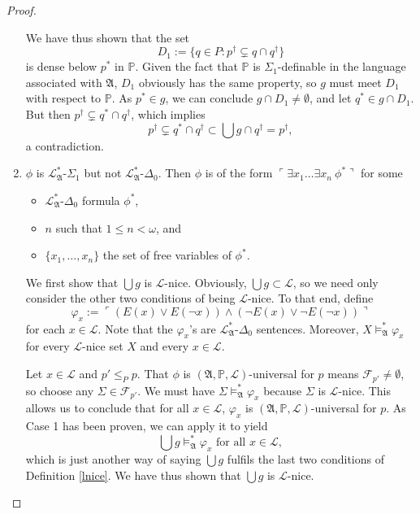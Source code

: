 \documentclass[12pt]{article}
\numberwithin{equation}{section}
\begin{document}
\begin{proof}
\begin{enumerate}[label=Case \arabic*:, leftmargin=50pt]
    We have thus shown that the set $$D_1 := \{q \in P : p^{\dagger} \subsetneq q \cap q^{\dagger}\}$$ is dense below $p^*$ in $\mathbb{P}$. Given the fact that $\mathbb{P}$ is $\Sigma_1$-definable in the language associated with $\mathfrak{A}$, $D_1$ obviously has the same property, so $g$ must meet $D_1$ with respect to $\mathbb{P}$. As $p^* \in g$, we can conclude $g \cap D_1 \neq \emptyset$, and let $q^* \in g \cap D_1$. But then $p^{\dagger} \subsetneq q^* \cap q^{\dagger}$, which implies $$p^{\dagger} \subsetneq q^* \cap q^{\dagger} \subset \bigcup g \cap q^{\dagger} = p^{\dagger},$$ a contradiction. 
    
    \item $\phi$ is $\mathcal{L}^{*}_{\mathfrak{A}}$-$\Sigma_1$ but not $\mathcal{L}^{*}_{\mathfrak{A}}$-$\Delta_0$. Then $\phi$ is of the form $\ulcorner \exists x_1 \dots \exists x_n \ \phi^* \urcorner$ for some 
    \begin{itemize}
        \item $\mathcal{L}^{*}_{\mathfrak{A}}$-$\Delta_0$ formula $\phi^*$,
        \item $n$ such that $1 \leq n < \omega$, and
        \item $\{x_1, \dots, x_n\}$ the set of free variables of $\phi^*$.
    \end{itemize} 
    
    We first show that $\bigcup g$ is $\mathcal{L}$-nice. Obviously, $\bigcup g \subset \mathcal{L}$, so we need only consider the other two conditions of being $\mathcal{L}$-nice. To that end, define $$\varphi_x := \ulcorner (E(x) \vee E(\neg x)) \wedge (\neg E(x) \vee \neg E(\neg x)) \urcorner$$ for each $x \in \mathcal{L}$. Note that the $\varphi_x$'s are $\mathcal{L}^{*}_{\mathfrak{A}}$-$\Delta_0$ sentences. Moreover, $X \models^{*}_{\mathfrak{A}} \varphi_x$ for every $\mathcal{L}$-nice set $X$ and every $x \in \mathcal{L}$. 
    
    Let $x \in \mathcal{L}$ and $p' \leq_{P} p$. That $\phi$ is $(\mathfrak{A}, \mathbb{P}, \mathcal{L})$-universal for $p$ means $\mathcal{F}_{p'} \neq \emptyset$, so choose any $\Sigma \in \mathcal{F}_{p'}$. We must have $\Sigma \models^{*}_{\mathfrak{A}} \varphi_x$ because $\Sigma$ is $\mathcal{L}$-nice. This allows us to conclude that for all $x \in \mathcal{L}$, $\varphi_x$ is $(\mathfrak{A}, \mathbb{P}, \mathcal{L})$-universal for $p$. As Case 1 has been proven, we can apply it to yield $$\bigcup g \models^{*}_{\mathfrak{A}} \varphi_x \text{ for all } x \in \mathcal{L},$$ which is just another way of saying $\bigcup g$ fulfils the last two conditions of Definition \ref{lnice}. We have thus shown that $\bigcup g$ is $\mathcal{L}$-nice. 
    

\end{enumerate}
\end{proof}
\end{document}
